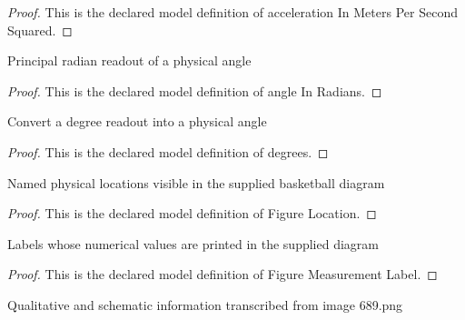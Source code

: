 \begin{proof}
  This is the declared model definition of acceleration In Meters Per Second Squared.
\end{proof}
\begin{definition}
  \label{def:physics:phyx-mini-0689:phyxminiproblems-problemphyxmini0689-angleinradians}
  Principal radian readout of a physical angle
\end{definition}
\begin{proof}
  This is the declared model definition of angle In Radians.
\end{proof}
\begin{definition}[degrees]
  \label{def:physics:phyx-mini-0689:phyxminiproblems-problemphyxmini0689-degrees}
  Convert a degree readout into a physical angle
\end{definition}
\begin{proof}
  This is the declared model definition of degrees.
\end{proof}
\begin{definition}
  \label{def:physics:phyx-mini-0689:phyxminiproblems-problemphyxmini0689-figurelocation}
  Named physical locations visible in the supplied basketball diagram
\end{definition}
\begin{proof}
  This is the declared model definition of Figure Location.
\end{proof}
\begin{definition}
  \label{def:physics:phyx-mini-0689:phyxminiproblems-problemphyxmini0689-figuremeasurementlabel}
  Labels whose numerical values are printed in the supplied diagram
\end{definition}
\begin{proof}
  This is the declared model definition of Figure Measurement Label.
\end{proof}
\begin{definition}
  \label{def:physics:phyx-mini-0689:phyxminiproblems-problemphyxmini0689-basketballshotfigure}
  Qualitative and schematic information transcribed from image 689.png
\end{definition}
